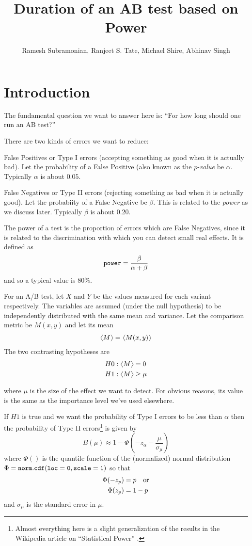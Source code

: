 \documentclass[letterpaper,12pt]{article}
\newcommand{\beq}{\begin{equation}} %
\newcommand{\eeq}{\end{equation}} %
\newcommand{\bdm}{\begin{displaymath}} %
\newcommand{\edm}{\end{displaymath}} %
\newcommand{\langl}{\begin{picture}(4.5,7)
\put(1.1,2.5){\rotatebox{60}{\line(1,0){5.5}}}
\put(1.1,2.5){\rotatebox{300}{\line(1,0){5.5}}}
\end{picture}}
\newcommand{\rangl}{\begin{picture}(4.5,7)
\put(.9,2.5){\rotatebox{120}{\line(1,0){5.5}}}
\put(.9,2.5){\rotatebox{240}{\line(1,0){5.5}}}
\end{picture}}
\newcommand{\mymean}[1]{\ensuremath{\langl{#1}\rangl}} %
\begin{document}
\title{Duration of an AB test based on Power}
\author{Ramesh Subramonian, Ranjeet S. Tate, Michael Shire, Abhinav Singh}
\date{}
\maketitle
\thispagestyle{fancy}
\lhead{}
\chead{}
\rhead{}
\lfoot{}

\section{Introduction}
\label{sec:intro}
The fundamental question we want to answer here is: ``For how long should one run an AB test?''

There are two kinds of errors we want to reduce:
\be
\item False Positives or Type I errors (accepting something as good
  when it is actually bad). Let the probability of a False Positive
  (also known as the \(p\)-{\em value} be \(\alpha\). Typically
  \(\alpha\) is about \(0.05\).
\item False Negatives or Type II errors (rejecting something as bad
  when it is actually good). Let the probabiity of a False Negative be
  \(\beta\). This is related to the {\em power} as we discuss
  later. Typically \(\beta\) is about \(0.20\).
\ee

The power of a test is the proportion of errors which are False Negatives, since it is related to the discrimination with which you can detect small real effects. It is defined as
\bdm
    {\tt power} = \frac\beta{\alpha+\beta}
\edm
and so a typical value is \(80\%\).

For an A/B test, let \(X\) and \(Y\) be the values measured for each variant respectively. The variables are assumed (under the null hypothesis) to be independently distributed with the same mean and variance.
Let the comparison metric be
\(M(x,y)\) and let its mean
\beq
\mymean{M} = \mymean{M(x,y)}
\eeq
The two contrasting hypotheses are
\beq
\begin{split}
  H0&:\mymean{M} = 0\\
  H1&:\mymean{M} \ge \mu\\
\end{split}
\eeq

where \(\mu\) is the size of the effect we want to detect. For obvious reasons, its value is the same as the importance level we've used elsewhere.

If \(H1\) is true and we want the probability of Type I errors to be less than \(\alpha\) then the probability of Type II errors\footnote{Almost everything here is a slight generalization of the results in the Wikipedia article on ``Statistical Power'' \url{}.} is given by
\beq
B(\mu) \approx 1- \Phi(-z_\alpha -\frac{\mu}{\sigma_\mu})
\eeq
where \(\Phi()\) is the quantile function of the (normalized) normal distribution \(\Phi ={\tt norm.cdf(loc = 0, scale = 1)}\) so that
\beq
\begin{split}
  \Phi(-z_p) &=p\quad{\rm or}\\
  \Phi(z_p) &= 1-p
\end{split}
\eeq
and \(\sigma_\mu\) is the standard error in \(\mu\).
\end{document}
